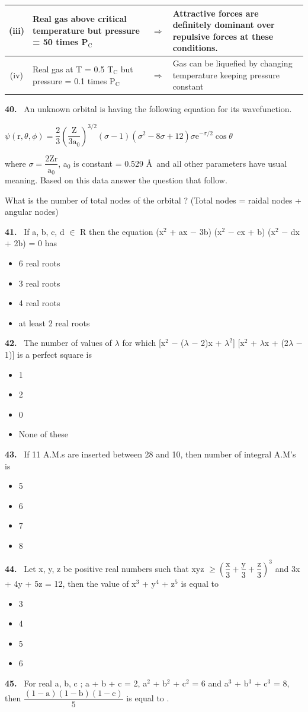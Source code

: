 \documentclass[10pt]{extarticle}
\newcommand{\papersec}[1]{\par\bigskip{\centering\Large\bfseries PAPER-#1\par}\medskip}
\newcommand{\partsec}[2]{\par\medskip\noindent{\large\bfseries PART-#1: #2}\par\smallskip}
\newcommand{\qn}[1]{\par\smallskip\noindent\textbf{#1.}~}
\newenvironment{qoptions}{\begin{itemize}[leftmargin=1.8em,itemsep=1pt,topsep=2pt,label={}]}{\end{itemize}}
\newcommand{\opt}[2]{\item[(#1)] #2}
\begin{document}
\begin{multicols}{2}
{\begin{tabular}{|c|L{2.6cm}|c|L{3.2cm}|}
\hline
(iii) & Real gas above critical temperature but pressure = 50 times P$_\mathrm C$ & $\Rightarrow$ & Attractive forces are definitely dominant over repulsive forces at these conditions. \\
\hline
(iv) & Real gas at T = 0.5 T$_\mathrm C$ but pressure = 0.1 times P$_\mathrm C$ & $\Rightarrow$ & Gas can be liquefied by changing temperature keeping pressure constant \\
\hline
\end{tabular}}\par
\qn{40} An unknown orbital is having the following equation for its wavefunction.\par
$\psi(\mathrm r,\theta,\phi)=\dfrac23\left(\dfrac{\mathrm Z}{3\mathrm a_0}\right)^{3/2}(\sigma-1)(\sigma^2-8\sigma+12)\sigma\mathrm e^{-\sigma/2}\cos\theta$\par
where $\sigma=\dfrac{2\mathrm{Zr}}{\mathrm a_0}$, a$_0$ is constant = 0.529 \AA\ and all other parameters have usual meaning. Based on this data answer the question that follow.\par
What is the number of total nodes of the orbital ? (Total nodes = raidal nodes + angular nodes)
\raggedcolumns
\papersec{1}
\partsec{3}{MATHEMATICS}
\qn{41} If a, b, c, d $\in$ R then the equation (x$^2$ + ax $-$ 3b) (x$^2$ $-$ cx + b) (x$^2$ $-$ dx + 2b) = 0 has
\begin{qoptions}
\opt{A}{6 real roots}
\opt{B}{3 real roots}
\opt{C}{4 real roots}
\opt{D}{at least 2 real roots}
\end{qoptions}
\qn{42} The number of values of $\lambda$ for which [x$^2$ $-$ ($\lambda$ $-$ 2)x + $\lambda^2$] [x$^2$ + $\lambda$x + (2$\lambda$ $-$ 1)] is a perfect square is
\begin{qoptions}
\opt{A}{1}
\opt{B}{2}
\opt{C}{0}
\opt{D}{None of these}
\end{qoptions}
\qn{43} If 11 A.M.s are inserted between 28 and 10, then number of integral A.M's is
\begin{qoptions}
\opt{A}{5}
\opt{B}{6}
\opt{C}{7}
\opt{D}{8}
\end{qoptions}
\qn{44} Let x, y, z be positive real numbers such that xyz $\geq\left(\dfrac{\mathrm x}3+\dfrac{\mathrm y}3+\dfrac{\mathrm z}3\right)^3$ and 3x + 4y + 5z = 12, then the value of x$^3$ + y$^4$ + z$^5$ is equal to \underline{\hspace{1.5cm}}
\begin{qoptions}
\opt{A}{3}
\opt{B}{4}
\opt{C}{5}
\opt{D}{6}
\end{qoptions}
\qn{45} For real a, b, c ; a + b + c = 2, a$^2$ + b$^2$ + c$^2$ = 6 and a$^3$ + b$^3$ + c$^3$ = 8, then $\dfrac{(1-\mathrm a)(1-\mathrm b)(1-\mathrm c)}5$ is equal to \underline{\hspace{1.5cm}}.

\end{multicols}
\end{document}
